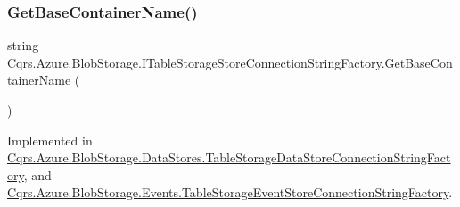 \subsubsection{\texorpdfstring{Get\+Base\+Container\+Name()}{GetBaseContainerName()}}
{\footnotesize\ttfamily string Cqrs.\+Azure.\+Blob\+Storage.\+I\+Table\+Storage\+Store\+Connection\+String\+Factory.\+Get\+Base\+Container\+Name (\begin{DoxyParamCaption}{ }\end{DoxyParamCaption})}



Implemented in \hyperlink{classCqrs_1_1Azure_1_1BlobStorage_1_1DataStores_1_1TableStorageDataStoreConnectionStringFactory_a03239d850e3fd95cd1507780425a7c94}{Cqrs.\+Azure.\+Blob\+Storage.\+Data\+Stores.\+Table\+Storage\+Data\+Store\+Connection\+String\+Factory}, and \hyperlink{classCqrs_1_1Azure_1_1BlobStorage_1_1Events_1_1TableStorageEventStoreConnectionStringFactory_a118388598a7fa653122fc11521c915d7}{Cqrs.\+Azure.\+Blob\+Storage.\+Events.\+Table\+Storage\+Event\+Store\+Connection\+String\+Factory}.

